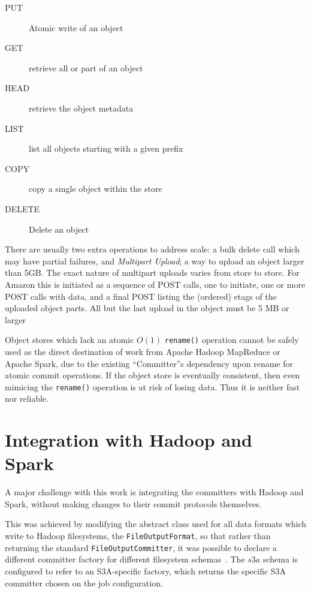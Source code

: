 \documentclass[conference]{IEEEtran}
\begin{document}
\begin{description}
  \item[PUT] Atomic write of an object
  \item[GET] retrieve all or part of an object
  \item[HEAD] retrieve the object metadata
  \item[LIST] list all objects starting with a given prefix
  \item[COPY] copy a single object within the store
  \item[DELETE] Delete an object
\end{description}

There are usually two extra operations to address scale:
 a bulk delete call which may have partial failures,
and \emph{Multipart Upload}; a way to upload an object larger than 5GB\@.
The exact nature of multipart uploads varies from store to store.
For Amazon this is initiated as a sequence of POST calls, one to initiate,
one or more POST calls with data, and a final POST listing the (ordered)
etags of the uploaded object parts.
All but the last upload in the object must be 5 MB or larger


Object stores which lack an atomic $O(1)$ \texttt{rename()} operation cannot
be safely used as the direct destination of work from Apache Hadoop MapReduce
or Apache Spark, due to the existing ``Committer''s dependency upon rename for
atomic commit operations.
If the object store is eventually consistent, then even mimicing the \texttt{rename()}
operation is at risk of losing data.
Thus it is neither fast nor reliable.

\section{Integration with Hadoop and Spark}
\label{sec:integration}

A major challenge with this work is integrating the committers with Hadoop
and Spark, without making changes to their commit protocols themselves.

This was achieved by modifying the abstract class used for all data formats
which write to Hadoop filesystems, the \texttt{FileOutputFormat}, so that rather than
returning the standard \texttt{FileOutputCommitter}, it was possible to declare
a different committer factory for different filesystem schemas\ \cite{MAPREDUCE-6823}.
The $s3a$ schema is configured to refer to an S3A-specific factory, which
returns the specific S3A committer chosen on the job configuration.
\end{document}
